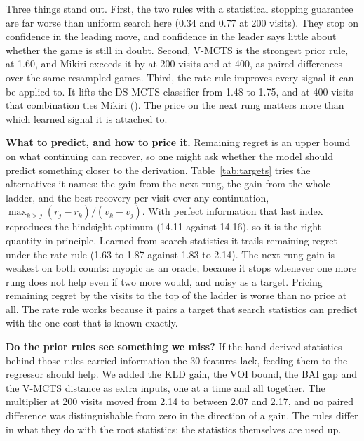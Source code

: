 \documentclass{article}
\begin{document}
Three things stand out. First, the two rules with a statistical stopping guarantee are far worse than uniform search here (0.34 and 0.77 at 200 visits). They stop on confidence in the leading move, and confidence in the leader says little about whether the game is still in doubt. Second, V-MCTS is the strongest prior rule, at 1.60, and Mikiri exceeds it by \pairedVmctsTwo{} at 200 visits and \pairedVmctsFour{} at 400, as paired differences over the same resampled games. Third, the rate rule improves every signal it can be applied to. It lifts the DS-MCTS classifier from 1.48 to 1.75, and at 400 visits that combination ties Mikiri (\pairedDsRateFour). The price on the next rung matters more than which learned signal it is attached to.

\textbf{What to predict, and how to price it.} Remaining regret is an upper bound on what continuing can recover, so one might ask whether the model should predict something closer to the derivation. Table~\ref{tab:targets} tries the alternatives it names: the gain from the next rung, the gain from the whole ladder, and the best recovery per visit over any continuation, $\max_{k>j}(r_j-r_k)/(v_k-v_j)$. With perfect information that last index reproduces the hindsight optimum (14.11 against 14.16), so it is the right quantity in principle. Learned from search statistics it trails remaining regret under the rate rule (1.63 to 1.87 against 1.83 to 2.14). The next-rung gain is weakest on both counts: myopic as an oracle, because it stops whenever one more rung does not help even if two more would, and noisy as a target. Pricing remaining regret by the visits to the top of the ladder is worse than no price at all. The rate rule works because it pairs a target that search statistics can predict with the one cost that is known exactly.

\begin{table}[t]
\centering\footnotesize
\setlength{\tabcolsep}{3.5pt}

\caption{Multipliers for different quantities to score at rung $j$ and prices to divide them by ($m$ is the top rung). Oracle: true quantity, four-rung ladder, 100 visits. Learned: the same model fitted to each quantity, 200 visits, three ladders.}
\label{tab:targets}
\end{table}

\textbf{Do the prior rules see something we miss?} If the hand-derived statistics behind those rules carried information the 30 features lack, feeding them to the regressor should help. We added the KLD gain, the VOI bound, the BAI gap and the V-MCTS distance as extra inputs, one at a time and all together. The multiplier at 200 visits moved from 2.14 to between 2.07 and 2.17, and no paired difference was distinguishable from zero in the direction of a gain. The rules differ in what they do with the root statistics; the statistics themselves are used up.
\end{document}
